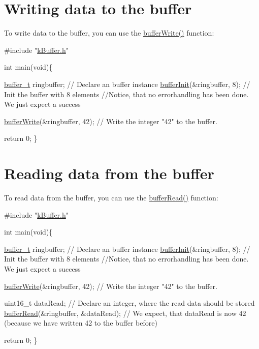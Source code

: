  \hypertarget{fundamental_usage_write}{}\section{Writing data to the buffer}\label{fundamental_usage_write}
To write data to the buffer, you can use the \hyperlink{k_buffer_8c_a9d6410a89adf65a3ef12340ecb9bbd55}{buffer\+Write()} function\+: 
\begin{DoxyCode}
\textcolor{preprocessor}{#include "\hyperlink{k_buffer_8h}{kBuffer.h}"}

\textcolor{keywordtype}{int} main(\textcolor{keywordtype}{void})\{

 \hyperlink{structbuffer__t}{buffer\_t} ringbuffer;            \textcolor{comment}{// Declare an buffer instance}
 \hyperlink{k_buffer_8c_aec18d6ea571b1326dbeb7ca15f4969c0}{bufferInit}(&ringbuffer, 8);     \textcolor{comment}{// Init the buffer with 8 elements}
 \textcolor{comment}{//Notice, that no errorhandling has been done. We just expect a success}
 
 \hyperlink{k_buffer_8c_a9d6410a89adf65a3ef12340ecb9bbd55}{bufferWrite}(&ringbuffer, 42);   \textcolor{comment}{// Write the integer "42" to the buffer.}

 \textcolor{keywordflow}{return} 0;
\}
\end{DoxyCode}
 \hypertarget{fundamental_usage_read}{}\section{Reading data from the buffer}\label{fundamental_usage_read}
To read data from the buffer, you can use the \hyperlink{k_buffer_8c_a9b80be9033ccd6b5a101f811520ab4cc}{buffer\+Read()} function\+: 
\begin{DoxyCode}
\textcolor{preprocessor}{#include "\hyperlink{k_buffer_8h}{kBuffer.h}"}

\textcolor{keywordtype}{int} main(\textcolor{keywordtype}{void})\{

 \hyperlink{structbuffer__t}{buffer\_t} ringbuffer;                \textcolor{comment}{// Declare an buffer instance}
 \hyperlink{k_buffer_8c_aec18d6ea571b1326dbeb7ca15f4969c0}{bufferInit}(&ringbuffer, 8);         \textcolor{comment}{// Init the buffer with 8 elements}
 \textcolor{comment}{//Notice, that no errorhandling has been done. We just expect a success}
 
 \hyperlink{k_buffer_8c_a9d6410a89adf65a3ef12340ecb9bbd55}{bufferWrite}(&ringbuffer, 42);       \textcolor{comment}{// Write the integer "42" to the buffer.}

 uint16\_t dataRead;                  \textcolor{comment}{// Declare an integer, where the read data should be stored}
 \hyperlink{k_buffer_8c_a9b80be9033ccd6b5a101f811520ab4cc}{bufferRead}(&ringbuffer, &dataRead); \textcolor{comment}{// We expect, that dataRead is now 42 (because we have
       written 42 to the buffer before)}

 \textcolor{keywordflow}{return} 0;
\}
\end{DoxyCode}
 